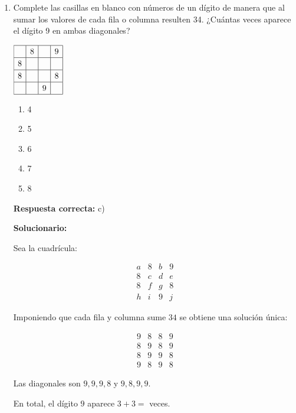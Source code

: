 \begin{enumerate}[resume]

	
	\item Complete las casillas en blanco con números de un dígito de manera que al sumar los valores de cada fila o columna resulten 34. ¿Cuántas veces aparece el dígito 9 en ambas diagonales?
	
	\begin{center}
		$
		\renewcommand{\arraystretch}{1.2}
		\begin{array}{|c|c|c|c|}
			\hline
			& 8 &  & 9 \\
			\hline
			8 &  &  &  \\
			\hline
			8 &  &  & 8 \\
			\hline
			&  & 9 &  \\
			\hline
		\end{array}
		$
	\end{center}
	
	\begin{enumerate}[label=\alph*)]
		\item 4
		\item 5
		\item 6
		\item 7
		\item 8
	\end{enumerate}
	\textbf{Respuesta correcta:} c)
	
	\vspace{2mm}
	\textbf{Solucionario:}
	
	Sea la cuadrícula:
	
	$$
	\begin{matrix}
		a&8&b&9\\
		8&c&d&e\\
		8&f&g&8\\
		h&i&9&j
	\end{matrix}
	$$
	
	Imponiendo que cada fila y columna sume $34$ se obtiene una solución única:
	
	$$
	\begin{matrix}
		9&8&8&9\\
		8&9&8&9\\
		8&9&9&8\\
		9&8&9&8
	\end{matrix}
	$$
	
	Las diagonales son $9,9,9,8$ y $9,8,9,9$.
	
	En total, el dígito $9$ aparece $3+3=$	 veces.
	


\end{enumerate}
